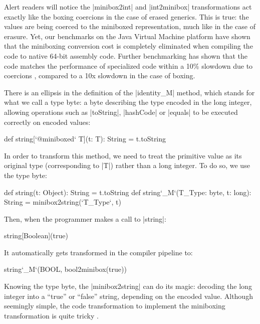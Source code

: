 Alert readers will notice the |minibox2int| and |int2minibox| transformations act exactly like the boxing coercions in the case of erased generics. This is true: the values are being coerced to the miniboxed representation, much like in the case of erasure. Yet, our benchmarks on the Java Virtual Machine platform have shown that the miniboxing conversion cost is completely eliminated when compiling the code to native 64-bit assembly code. Further benchmarking has shown that the code matches the performance of specialized code within a 10\% slowdown due to coercions \cite{miniboxing}, compared to a 10x slowdown in the case of boxing.

There is an ellipsis in the definition of the |identity_M| method, which stands for what we call a type byte: a byte describing the type encoded in the long integer, allowing operations such as |toString|, |hashCode| or |equals| to be executed correctly on encoded values:

\begin{lstlisting-nobreak}
 def string[`@miniboxed` T](t: T): String = t.toString
\end{lstlisting-nobreak}

In order to transform this method, we need to treat the primitive value as its original type (corresponding to |T|) rather than a long integer. To do so, we use the type byte:

\begin{lstlisting-nobreak}
 def string(t: Object): String = t.toString
 def string`_M`(T_Type: byte, t: long): String =
                                       minibox2string(`T_Type`, t)
\end{lstlisting-nobreak}

Then, when the programmer makes a call to |string|:

\begin{lstlisting-nobreak}
 string[Boolean](true)
\end{lstlisting-nobreak}

It automatically gets transformed in the compiler pipeline to:

\begin{lstlisting-nobreak}
 string`_M`(BOOL, bool2minibox(true))
\end{lstlisting-nobreak}

Knowing the type byte, the |minibox2string| can do its magic: decoding the long integer into a ``true'' or ``false'' string, depending on the encoded value. Although seemingly simple, the code transformation to implement the miniboxing transformation is quite tricky \cite{miniboxing-linkedlist, ldl, ildl-tech}.

